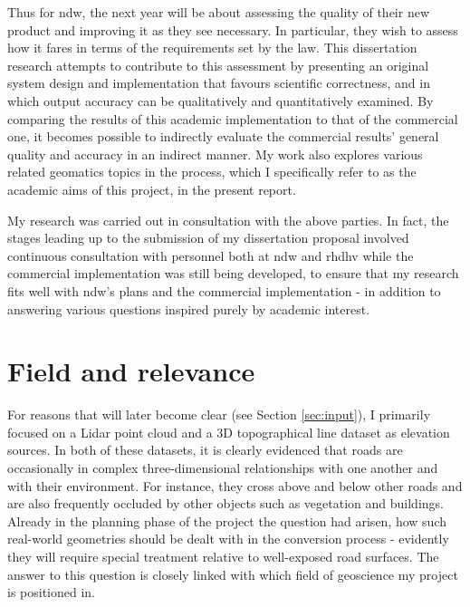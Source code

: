 Thus for \ac{ndw}, the next year will be about assessing the quality of their new product and improving it as they see necessary. In particular, they wish to assess how it fares in terms of the requirements set by the law. This dissertation research attempts to contribute to this assessment by presenting an original system design and implementation that favours scientific correctness, and in which output accuracy can be qualitatively and quantitatively examined. By comparing the results of this academic implementation to that of the commercial one, it becomes possible to indirectly evaluate the commercial results' general quality and accuracy in an indirect manner. My work also explores various related geomatics topics in the process, which I specifically refer to as the academic aims of this project, in the present report.

My research was carried out in consultation with the above parties. In fact, the stages leading up to the submission of my dissertation proposal involved continuous consultation with personnel both at \ac{ndw} and \ac{rhdhv} while the commercial implementation was still being developed, to ensure that my research fits well with \ac{ndw}'s plans and the commercial implementation - in addition to answering various questions inspired purely by academic interest.

\section{Field and relevance}
\label{sec:relevance}

For reasons that will later become clear (see Section \ref{sec:input}), I primarily focused on a Lidar point cloud and a 3D topographical line dataset as elevation sources. In both of these datasets, it is clearly evidenced that roads are occasionally in complex three-dimensional relationships with one another and with their environment. For instance, they cross above and below other roads and are also frequently occluded by other objects such as vegetation and buildings. Already in the planning phase of the project the question had arisen, how such real-world geometries should be dealt with in the conversion process - evidently they will require special treatment relative to well-exposed road surfaces. The answer to this question is closely linked with which field of geoscience my project is positioned in.

